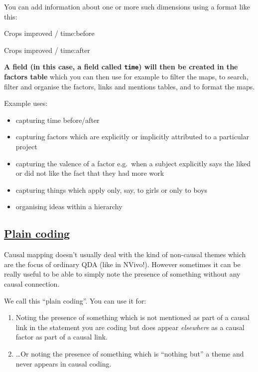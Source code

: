 \documentclass[
]{book}
\providecommand{\tightlist}{%
  \setlength{\itemsep}{0pt}\setlength{\parskip}{0pt}}
\begin{document}
You can add information about one or more such dimensions using a format like this:

Crops improved / time:before

Crops improved / time:after

\textbf{A field (in this case, a field called \texttt{time}) will then be created in the factors table} which you can then use for example to filter the maps, to search, filter and organise the factors, links and mentions tables, and to format the maps.

Example uses:

\begin{itemize}
\tightlist
\item
  capturing time before/after
\item
  capturing factors which are explicitly or implicitly attributed to a particular project
\item
  capturing the valence of a factor e.g.~when a subject explicitly says the liked or did not like the fact that they had more work
\item
  capturing things which apply only, say, to girls or only to boys
\item
  organising ideas within a hierarchy
\end{itemize}

\hypertarget{plain-coding}{%
\subsection{\texorpdfstring{\protect\hyperlink{plain-coding}{Plain coding}}{Plain coding}}\label{plain-coding}}

Causal mapping doesn't usually deal with the kind of non-causal themes which are the focus of ordinary QDA (like in NVivo!). However sometimes it can be really useful to be able to simply note the presence of something without any causal connection.

We call this ``plain coding''. You can use it for:

\begin{enumerate}
\def\labelenumi{\arabic{enumi}.}
\tightlist
\item
  Noting the presence of something which is not mentioned as part of a causal link in the statement you are coding but does appear \emph{elsewhere} as a causal factor as part of a causal link.
\item
  \ldots Or noting the presence of something which is ``nothing but'' a theme and never appears in causal coding.
\end{enumerate}
\end{document}
